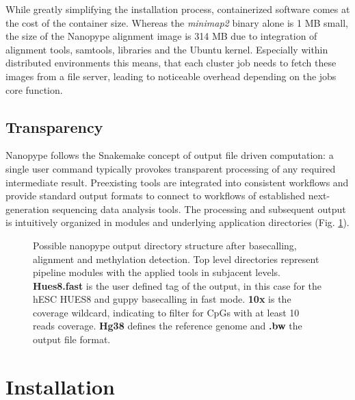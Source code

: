 While greatly simplifying the installation process, containerized software comes at the cost of the container size. Whereas the \textit{minimap2} binary alone is 1 MB small, the size of the Nanopype alignment image is 314 MB due to integration of alignment tools, samtools, libraries and the Ubuntu kernel. Especially within distributed environments this means, that each cluster job needs to fetch these images from a file server, leading to noticeable overhead depending on the jobs core function. 


\subsection{Transparency}
\label{subsec:nanopype:transparency}
Nanopype follows the Snakemake concept of output file driven computation: a single user command typically provokes transparent processing of any required intermediate result. Preexisting tools are integrated into consistent workflows and provide standard output formats to connect to workflows of established next-generation sequencing data analysis tools. The processing and subsequent output is intuitively organized in modules and underlying application directories (Fig. \ref{fig:nanopype:dir_tree}).

\begin{figure}[h]
	\centering
	\begin{minipage}{.7\linewidth}
	\end{minipage}
	\captionsetup{format=plain}
	\caption[Possible nanopype output directory]{Possible nanopype output directory structure after basecalling, alignment and methylation detection. Top level directories represent pipeline modules with the applied tools in subjacent levels. \textbf{Hues8.fast} is the user defined tag of the output, in this case for the hESC HUES8 and guppy basecalling in fast mode. \textbf{10x} is the coverage wildcard, indicating to filter for CpGs with at least 10 reads coverage. \textbf{Hg38} defines the reference genome and \textbf{.bw} the output file format.}
	\label{fig:nanopype:dir_tree}
\end{figure}




\section{Installation}
\label{sec:nanopype:installation}

